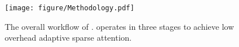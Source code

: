 \begin{figure}[t]
    \centering
    \texttt{[image: figure/Methodology.pdf]}
    \caption{ The overall workflow of \sys. \sys operates in three stages to achieve low overhead adaptive sparse attention.
    }
    \label{fig:Methodology}
    \vspace{-0.1in}
\end{figure}
